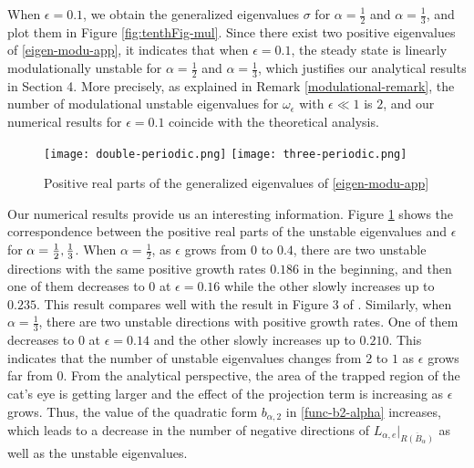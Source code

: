 \documentclass[1 [leqno, 11pt]{amsart}
\numberwithin{equation}{section}
\let\ep=\epsilon
\begin{document}
\begin{CJK*}{GBK}{song}
When $\epsilon = 0.1$, we obtain the generalized eigenvalues $\sigma$ for $\alpha = \frac 1 2$ and $\alpha = \frac 1 3$, and plot them in Figure \ref{fig:tenthFig-mul}. Since there exist two positive eigenvalues  of \eqref{eigen-modu-app}, it indicates that when $\ep = 0.1$, the steady state is linearly modulationally unstable for $\alpha = \frac 1 2$ and $\alpha = \frac 1 3$, which justifies our analytical results in Section 4.
More precisely, as explained in Remark \ref{modulational-remark},
 the number of modulational  unstable eigenvalues for  $\omega_\ep$ with $\ep\ll1$ is $2$, and our numerical results for $\ep=0.1$ coincide with the theoretical analysis.
\fi
\begin{figure}[ht]
    \centering
	\texttt{[image: double-periodic.png]}
        \texttt{[image: three-periodic.png]}
	\caption{Positive real parts of the generalized eigenvalues of \eqref{eigen-modu-app}  }
	\label{fig:eleventhFig}
\end{figure}


Our numerical results provide us  an interesting information.
Figure \ref{fig:eleventhFig} shows the correspondence between the positive real parts of the unstable eigenvalues and $\ep$ for  $\alpha={1\over2}, {1\over3}$. When $\alpha = \frac{1}{2}$, as $\ep$ grows from $0$ to $0.4$, there are two unstable directions with the same positive growth rates $0.186$ in the beginning, and then one of them decreases to $0$ at $\ep = 0.16$ while the other slowly increases up to $0.235$. This result compares well with the result in Figure 3 of \cite{pierrehumbert1982two}. Similarly, when $\alpha = \frac{1}{3}$, there are two unstable directions with positive growth rates. One of them decreases to $0$ at $\ep = 0.14$ and the other slowly increases up to $0.210$. This indicates that the number of unstable eigenvalues changes from $2$ to $1$ as $\ep$ grows far from $0$.
From the analytical perspective, the area of  the trapped region of the cat's eye is getting larger and the effect of  the projection term is increasing as $\ep$ grows. Thus, the value of  the quadratic form
$ b_{\alpha, 2}$ in \eqref{func-b2-alpha} increases,  which leads to a decrease in the number of negative directions of $L_{\alpha,e} |_{\overline{R(B_\alpha)}}  $ as well as the unstable eigenvalues.


\end{CJK*}
\end{document}
